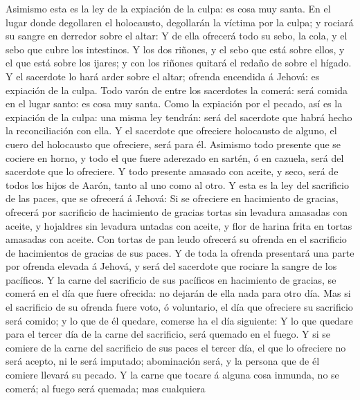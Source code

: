  Asimismo esta es la ley de la expiación de la culpa: es
cosa muy santa.  En el lugar donde degollaren el
holocausto, degollarán la víctima por la culpa; y rociará su sangre en
derredor sobre el altar:  Y de ella ofrecerá todo su sebo,
la cola, y el sebo que cubre los intestinos.  Y los dos
riñones, y el sebo que está sobre ellos, y el que está sobre los ijares;
y con los riñones quitará el redaño de sobre el hígado.  Y
el sacerdote lo hará arder sobre el altar; ofrenda encendida á Jehová:
es expiación de la culpa.  Todo varón de entre los
sacerdotes la comerá: será comida en el lugar santo: es cosa muy santa.
 Como la expiación por el pecado, así es la expiación de
la culpa: una misma ley tendrán: será del sacerdote que habrá hecho la
reconciliación con ella.  Y el sacerdote que ofreciere
holocausto de alguno, el cuero del holocausto que ofreciere, será para
él.  Asimismo todo presente que se cociere en horno, y
todo el que fuere aderezado en sartén, ó en cazuela, será del sacerdote
que lo ofreciere.  Y todo presente amasado con aceite, y
seco, será de todos los hijos de Aarón, tanto al uno como al otro.
 Y esta es la ley del sacrificio de las paces, que se
ofrecerá á Jehová:  Si se ofreciere en hacimiento de
gracias, ofrecerá por sacrificio de hacimiento de gracias tortas sin
levadura amasadas con aceite, y hojaldres sin levadura untadas con
aceite, y flor de harina frita en tortas amasadas con aceite.
 Con tortas de pan leudo ofrecerá su ofrenda en el
sacrificio de hacimientos de gracias de sus paces.  Y de
toda la ofrenda presentará una parte por ofrenda elevada á Jehová, y
será del sacerdote que rociare la sangre de los pacíficos.
 Y la carne del sacrificio de sus pacíficos en hacimiento
de gracias, se comerá en el día que fuere ofrecida: no dejarán de ella
nada para otro día.  Mas si el sacrificio de su ofrenda
fuere voto, ó voluntario, el día que ofreciere su sacrificio será
comido; y lo que de él quedare, comerse ha el día siguiente:
 Y lo que quedare para el tercer día de la carne del
sacrificio, será quemado en el fuego.  Y si se comiere de
la carne del sacrificio de sus paces el tercer día, el que lo ofreciere
no será acepto, ni le será imputado; abominación será, y la persona que
de él comiere llevará su pecado.  Y la carne que tocare á
alguna cosa inmunda, no se comerá; al fuego será quemada; mas cualquiera
